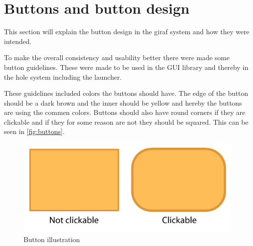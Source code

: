 \section{Buttons and button design}
This section will explain the button design in the giraf system and how they were intended.

To make the overall consistency and usability better there were made some button guidelines. These were made to be used in the \giraf[] GUI library and thereby in the hole \giraf[] system including the launcher.

These guidelines included colors the buttons should have. The edge of the button should be a dark brown and the inner should be yellow and hereby the buttons are using the commen \giraf[] colors. Buttons should also have round corners if they are clickable and if they for some reason are not they should be squared. This can be seen in \autoref{fig:buttons}.

\begin{figure}[h!]
	\centering
	\includegraphics[scale=0.6]{gfx/buttons.pdf}
	\caption{Button illustration}
	\label{fig:buttons}
\end{figure}


